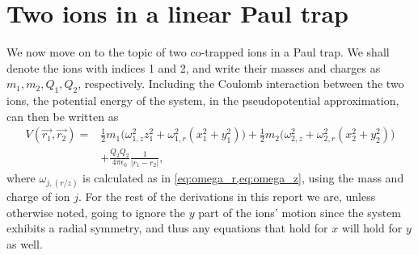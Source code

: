 \section{Two ions in a linear Paul trap}
\label{sec:2Ion}
We now move on to the topic of two co-trapped ions in a Paul trap. We shall denote the ions with indices 1 and 2, and write their masses and charges as $m_1,m_2,Q_1,Q_2$, respectively.
Including the Coulomb interaction between the two ions, the potential energy of the system, in the pseudopotential approximation, can then be written as
\begin{align}
    \nonumber V(\vec{r_1},\vec{r_2}) = &\frac{1}{2}m_1\bigg(\omega_{1,z}^2z_1^2+\omega_{1,r}^2(x_1^2+y_1^2)\bigg)+\frac{1}{2}m_2\bigg(\omega_{2,z}^2+\omega_{2,r}^2(x_2^2+y_2^2)\bigg)\\
    & +\frac{Q_2Q_2}{4\pi\epsilon_0}\frac{1}{\vert r_1-r_2\vert},
    \label{eq:fullV}
\end{align}
where $\omega_{j,(r/z)}$ is calculated as in \cref{eq:omega_r,eq:omega_z}, using the mass and charge of ion $j$.
For the rest of the derivations in this report we are, unless otherwise noted, going to ignore the $y$ part of the ions' motion since the system exhibits a radial symmetry, and thus any equations that hold for $x$ will hold for $y$ as well.

